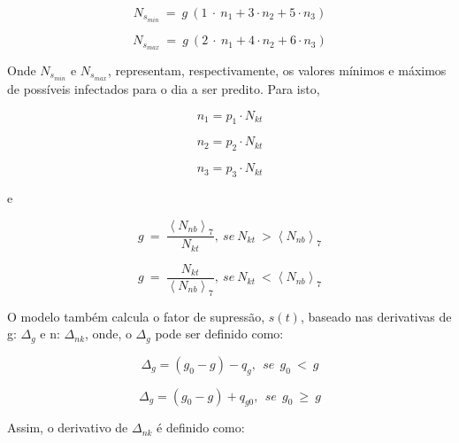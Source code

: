 \documentclass[a4paper,12pt]{article}
\begin{document}
\begin{equation} 
N_{s_{min}}\:=\:g\:\left(1\:\cdot \:n_1+3\cdot n_2+5\cdot n_3\right)
\label{eq1}
\end{equation}

\begin{equation} 
N_{s_{max}}\:=\:g\:\left(2\:\cdot \:n_1+4\cdot n_2+6\cdot n_3\right)
\label{eq2}
\end{equation}

\par Onde $N_{s_{min}}$ e $N_{s_{max}}$, representam, respectivamente, os valores mínimos e máximos de possíveis infectados para o dia a ser predito. Para isto,

\begin{equation} 
n_1=p_1\cdot N_{kt}
\label{eq3}
\end{equation}

\begin{equation} 
n_2=p_2\cdot N_{kt}
\label{eq4}
\end{equation}

\begin{equation} 
n_3=p_3\cdot N_{kt}
\label{eq5}
\end{equation}

\par e

\begin{equation}
g\:=\:\frac{\left\langle N_{nb}\right\rangle _7}{N_{kt}},\:se\:N_{kt}\:>\left\langle N_{nb}\right\rangle _7
\label{eq6}
\end{equation}

\begin{equation}
g\:=\:\frac{N_{kt}}{\left\langle N_{nb}\right\rangle _7},\:se\:N_{kt}\:<\left\langle N_{nb}\right\rangle _7
\label{eq7}
\end{equation}

\par O modelo também calcula o fator de supressão, $s(t)$, baseado nas derivativas de g: $\Delta_g$ e n: $\Delta_{nk}$, onde, o $\Delta_g$ pode ser definido como:

\begin{equation}
\Delta _g=\left(g_0-g\right)-q_g,\:\:se\:\:g_0\:<\:g
\label{eq8}
\end{equation}

\begin{equation}
\Delta _g=\left(g_0-g\right)+q_{g0},\:\:se\:\:g_0\:\ge \:g
\label{eq9}
\end{equation}

\par Assim, o derivativo de $\Delta_{nk}$ é definido como:
\end{document}
